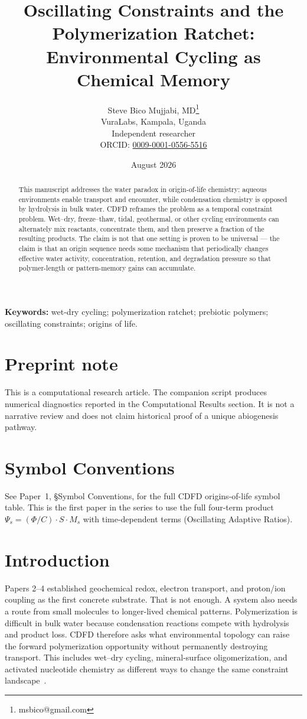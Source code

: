 \documentclass[11pt,a4paper]{article}
\title{Oscillating Constraints and the Polymerization Ratchet:\\ Environmental Cycling as Chemical Memory}
\author{Steve Bico Mujjabi, MD\thanks{msbico@gmail.com}\\
VuraLabs, Kampala, Uganda\\
Independent researcher\\
ORCID: \href{https://orcid.org/0009-0001-0556-5516}{0009-0001-0556-5516}}
\date{August 2026}
\begin{document}
\maketitle

\begin{abstract}
This manuscript addresses the water paradox in origin-of-life chemistry: aqueous environments enable transport and encounter, while condensation chemistry is opposed by hydrolysis in bulk water. CDFD reframes the problem as a temporal constraint problem. Wet--dry, freeze--thaw, tidal, geothermal, or other cycling environments can alternately mix reactants, concentrate them, and then preserve a fraction of the resulting products. The claim is not that one setting is proven to be universal --- the claim is that an origin sequence needs some mechanism that periodically changes effective water activity, concentration, retention, and degradation pressure so that polymer-length or pattern-memory gains can accumulate.
\end{abstract}

\noindent\textbf{Keywords:} wet-dry cycling; polymerization ratchet; prebiotic polymers; oscillating constraints; origins of life.

\section*{Preprint note}
This is a computational research article. The companion script produces numerical diagnostics reported in the Computational Results section. It is not a narrative review and does not claim historical proof of a unique abiogenesis pathway.

\section*{Symbol Conventions}
See Paper~1, \S Symbol Conventions, for the full CDFD origins-of-life symbol table. This is the first paper in the series to use the full four-term product $\Psi_s=(\Phi/C)\cdot S\cdot M_s$ with time-dependent terms (Oscillating Adaptive Ratios).

\section{Introduction}
Papers 2--4 established geochemical redox, electron transport, and proton/ion coupling as the first concrete substrate. That is not enough. A system also needs a route from small molecules to longer-lived chemical patterns. Polymerization is difficult in bulk water because condensation reactions compete with hydrolysis and product loss. CDFD therefore asks what environmental topology can raise the forward polymerization opportunity without permanently destroying transport. This includes wet--dry cycling, mineral-surface oligomerization, and activated nucleotide chemistry as different ways to change the same constraint landscape~\cite{Powner2009,Patel2015}.
\end{document}
